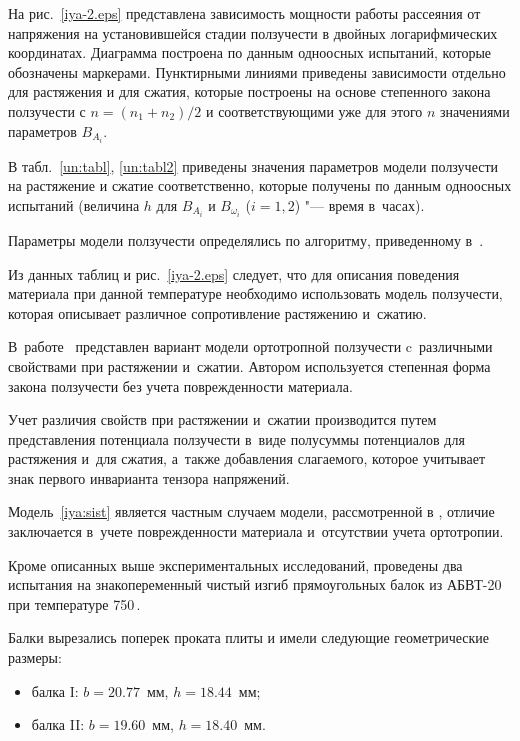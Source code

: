 На рис.~\ref{iya-2.eps} представлена зависимость мощности работы рассеяния от напряжения на установившейся стадии ползучести в двойных логарифмических координатах. Диаграмма построена по данным одноосных испытаний, которые обозначены маркерами. Пунктирными линиями приведены зависимости отдельно для растяжения и для сжатия, которые построены на основе степенного закона ползучести с $n=(n_{1}+n_{2})/2$ и соответствующими уже для этого $n$ значениями параметров $B_{A_i}$. 





В табл.~\ref{un:tabl}, \ref{un:tabl2} приведены значения параметров модели ползучести на растяжение и сжатие соответственно, которые получены по данным одноосных испытаний (величина $h$ для $B_{A_i}$ и $B_{\omega_{i}}$ ($i=1,2$) "--- время в~часах). 

Параметры модели ползучести определялись по алгоритму, приведенному в~\cite{iya:Gorev1994}. 

Из данных таблиц и рис.~\ref{iya-2.eps} следует, что для описания поведения материала при данной температуре необходимо использовать модель ползучести, которая описывает различное сопротивление растяжению и~сжатию. 

В~работе~\cite{iya:Tsvelodub2012} представлен вариант модели ортотропной ползучести c~различными свойствами при растяжении и~сжатии. Автором используется степенная форма закона ползучести без учета поврежденности материала. 

Учет различия свойств при растяжении и~сжатии производится путем представления потенциала ползучести в~виде полусуммы потенциалов для растяжения и~для сжатия, а~также добавления слагаемого, которое учитывает знак первого инварианта тензора напряжений. 

Модель~\eqref{iya:sist} является частным случаем модели, рассмотренной в \cite{iya:Tsvelodub2012}, отличие заключается в~учете поврежденности материала и~отсутствии учета ортотропии.









Кроме описанных выше экспериментальных исследований, проведены два испытания на знакопеременный чистый изгиб прямоугольных балок из АБВТ-20 при температуре 750\,\textcelsius. 

Балки вырезались поперек проката плиты и имели следующие геометрические размеры: 

\begin{itemize}

\item[--]балка I: $b = 20.77$~мм, $h = 18.44$~мм; 

\item[--]балка II: $b = 19.60$~мм, $h = 18.40$~мм.

\end{itemize}



